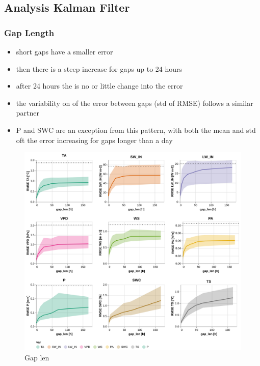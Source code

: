 \documentclass{article}
\newcommand{\imgwidth}{6in}
\let\Oldsubsection\subsection
\renewcommand{\subsection}{\FloatBarrier\Oldsubsection}
\begin{document}


\subsection{Analysis Kalman Filter}

\subsubsection{Gap Length}

\begin{itemize}
    \item short gaps have a smaller error
    \item then there is a steep increase for gaps up to 24 hours
    \item after 24 hours the is no or little change into the error
    \item the variability on of the error between gaps (std of RMSE) follows a similar partner
    \item P and SWC are an exception from this pattern, with both the mean and std oft the error increasing for gaps longer than a day
\end{itemize}




\begin{figure}
\centerline{\includegraphics[width=\imgwidth]{gap_len}}
\caption{Gap len}
\label{fig:gap_len}
\end{figure}
\end{document}

